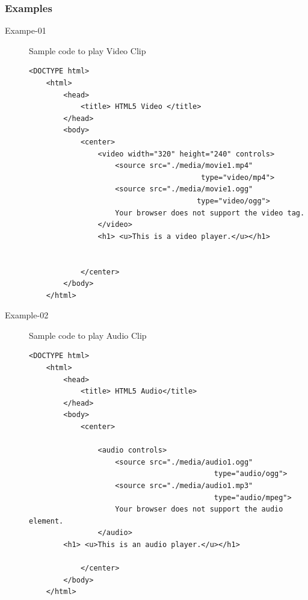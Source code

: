 \documentclass[11pt,a4paper]{article}
\begin{document}
\subsubsection*{Examples}
\begin{description}
\item [Exampe-01]

Sample code to play Video Clip

\begin{lstlisting}
<DOCTYPE html>
    <html>
        <head>
            <title> HTML5 Video </title>
        </head>
        <body>
            <center>
                <video width="320" height="240" controls>
                    <source src="./media/movie1.mp4" 
                                        type="video/mp4">
                    <source src="./media/movie1.ogg" 
                                       type="video/ogg">
                    Your browser does not support the video tag.
                </video> 
                <h1> <u>This is a video player.</u></h1>


            </center>
        </body>
    </html>
\end{lstlisting}

\item [Example-02]

Sample code to play Audio Clip

\begin{lstlisting}
<DOCTYPE html>
    <html>
        <head>
            <title> HTML5 Audio</title>
        </head>
        <body>
            <center>
                
                <audio controls>
                    <source src="./media/audio1.ogg" 
                                           type="audio/ogg">
                    <source src="./media/audio1.mp3" 
                                           type="audio/mpeg">
                    Your browser does not support the audio element.
                </audio>
		<h1> <u>This is an audio player.</u></h1>

            </center>
        </body>
    </html>
\end{lstlisting}
\end{description}

\end{document}
